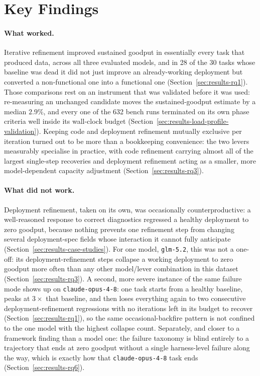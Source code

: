 \section{Key Findings}
\label{sec:conclusion-findings}

\paragraph{What worked.} Iterative refinement improved sustained goodput
in essentially every task that produced data, across all three evaluated
models, and in 28 of the 30 tasks whose baseline was dead it did not just
improve an already-working deployment but converted a non-functional one
into a functional one (Section~\ref{sec:results-rq1}). Those comparisons
rest on an instrument that was validated before it was used: re-measuring
an unchanged candidate moves the sustained-goodput estimate by a median
$2.9\%$, and every one of the 632 bench runs terminated on its own phase
criteria well inside its wall-clock budget
(Section~\ref{sec:results-load-profile-validation}). Keeping code and deployment refinement
mutually exclusive per iteration turned out to be more than a bookkeeping
convenience: the two levers measurably specialise in practice, with code
refinement carrying almost all of the largest single-step recoveries and
deployment refinement acting as a smaller, more model-dependent capacity
adjustment (Section~\ref{sec:results-rq3}).

\paragraph{What did not work.} Deployment refinement, taken on its own,
was occasionally counterproductive: a well-reasoned response to correct
diagnostics regressed a healthy deployment to zero goodput, because
nothing prevents one refinement step from changing several
deployment-spec fields whose interaction it cannot fully anticipate
(Section~\ref{sec:results-case-studies}). For one model, \texttt{glm-5.2}, this was
not a one-off: its deployment-refinement steps collapse a working
deployment to zero goodput more often than any other model/lever
combination in this dataset (Section~\ref{sec:results-rq3}). A second,
more severe instance of the same failure mode shows up on
\texttt{claude-opus-4-8}: one task starts from a healthy baseline, peaks at
$3\times$ that baseline, and then loses everything again to two
consecutive deployment-refinement regressions with no iterations left in
its budget to recover (Section~\ref{sec:results-rq1}), so the same
occasional-backfire pattern is not confined to the one model with the
highest collapse count. Separately, and closer to a framework finding than a
model one: the failure taxonomy is blind entirely to a trajectory that
ends at zero goodput without a single harness-level failure along the way,
which is exactly how that \texttt{claude-opus-4-8} task ends
(Section~\ref{sec:results-rq6}).

